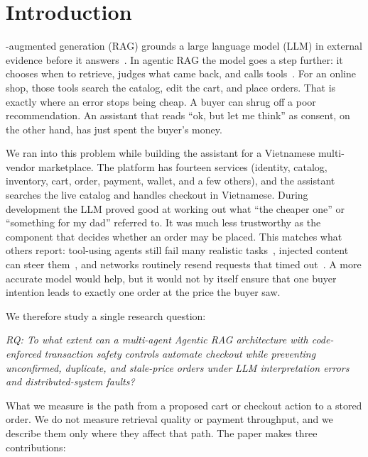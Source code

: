 \documentclass{IEEEtran}
\begin{document}
\section{Introduction}
\label{sec:introduction}

-augmented generation (RAG) grounds a large language model (LLM) in external evidence before it answers~\cite{lewis2020rag,gao2023ragsurvey}. In agentic RAG the model goes a step further: it chooses when to retrieve, judges what came back, and calls tools~\cite{singh2025agenticrag,yao2023react}. For an online shop, those tools search the catalog, edit the cart, and place orders. That is exactly where an error stops being cheap. A buyer can shrug off a poor recommendation. An assistant that reads ``ok, but let me think'' as consent, on the other hand, has just spent the buyer's money.

We ran into this problem while building the assistant for a Vietnamese multi-vendor marketplace. The platform has fourteen services (identity, catalog, inventory, cart, order, payment, wallet, and a few others), and the assistant searches the live catalog and handles checkout in Vietnamese. During development the LLM proved good at working out what ``the cheaper one'' or ``something for my dad'' referred to. It was much less trustworthy as the component that decides whether an order may be placed. This matches what others report: tool-using agents still fail many realistic tasks~\cite{yao2024taubench}, injected content can steer them~\cite{greshake2023injection}, and networks routinely resend requests that timed out~\cite{helland2012idempotence}. A more accurate model would help, but it would not by itself ensure that one buyer intention leads to exactly one order at the price the buyer saw.

We therefore study a single research question:

\emph{RQ: To what extent can a multi-agent Agentic RAG architecture with code-enforced transaction safety controls automate checkout while preventing unconfirmed, duplicate, and stale-price orders under LLM interpretation errors and distributed-system faults?}

What we measure is the path from a proposed cart or checkout action to a stored order. We do not measure retrieval quality or payment throughput, and we describe them only where they affect that path. The paper makes three contributions:
\end{document}
